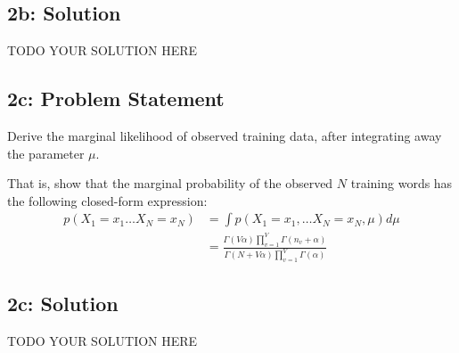 \documentclass[10pt]{article}
\newcommand{\officialdirections}[1]{{\color{purple} #1}}
\begin{document}
\subsection{2b: Solution}

TODO YOUR SOLUTION HERE


\officialdirections{
\subsection*{2c: Problem Statement}
Derive the marginal likelihood of observed training data, after integrating away the parameter $\mu$.

That is, show that the marginal probability of the observed $N$ training words has the following closed-form expression:
\begin{align}
p( X_1 = x_1 \ldots X_N = x_N) 
	&= \int p( X_1 = x_1, \ldots X_N = x_N, \mu ) d\mu
	\\
	&= \frac
	{ \Gamma(V \alpha)      \prod_{v=1}^V \Gamma( n_v + \alpha ) }
	{ \Gamma(N + V \alpha ) \prod_{v=1}^V \Gamma(\alpha)         }
\end{align}
}


\subsection{2c: Solution}
TODO YOUR SOLUTION HERE
\end{document}
